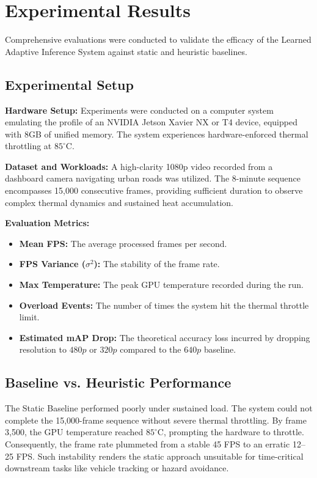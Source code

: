\documentclass{ieeeaccess}
\begin{document}
\section{Experimental Results}
\label{sec:experiments}
Comprehensive evaluations were conducted to validate the efficacy of the Learned Adaptive Inference System against static and heuristic baselines.

\subsection{Experimental Setup}
\textbf{Hardware Setup:} Experiments were conducted on a computer system emulating the profile of an NVIDIA Jetson Xavier NX or T4 device, equipped with 8GB of unified memory. The system experiences hardware-enforced thermal throttling at $85^\circ$C.

\textbf{Dataset and Workloads:} A high-clarity 1080p video recorded from a dashboard camera navigating urban roads was utilized. The 8-minute sequence encompasses 15,000 consecutive frames, providing sufficient duration to observe complex thermal dynamics and sustained heat accumulation.

\textbf{Evaluation Metrics:}
\begin{itemize}
    \item \textbf{Mean FPS:} The average processed frames per second.
    \item \textbf{FPS Variance ($\sigma^2$):} The stability of the frame rate.
    \item \textbf{Max Temperature:} The peak GPU temperature recorded during the run.
    \item \textbf{Overload Events:} The number of times the system hit the thermal throttle limit.
    \item \textbf{Estimated mAP Drop:} The theoretical accuracy loss incurred by dropping resolution to $480p$ or $320p$ compared to the $640p$ baseline.
\end{itemize}

\subsection{Baseline vs. Heuristic Performance}
The Static Baseline performed poorly under sustained load. The system could not complete the 15,000-frame sequence without severe thermal throttling. By frame 3,500, the GPU temperature reached $85^\circ$C, prompting the hardware to throttle. Consequently, the frame rate plummeted from a stable 45 FPS to an erratic 12–25 FPS. Such instability renders the static approach unsuitable for time-critical downstream tasks like vehicle tracking or hazard avoidance.
\end{document}
